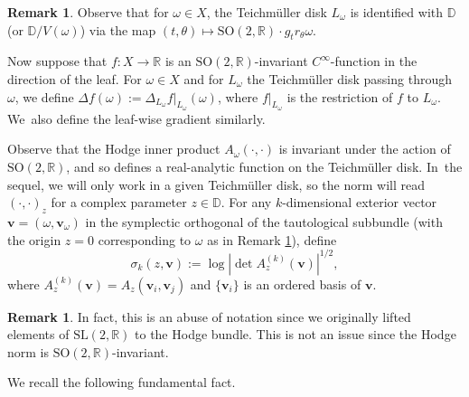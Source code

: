 \documentclass[JEP,XML,SOM,Unicode,published]{cedram}
\theoremstyle{plain}
\theoremstyle{definition}
\newtheorem{rem}[thm]{Remark}
\numberwithin{equation}{subsection}
\newcommand\bD{\mathbb{D}}
\newcommand\bR{\mathbb{R}}\let\R\bR
\newcommand{\SL}{\mathrm{SL}}
\newcommand{\SO}{\mathrm{SO}}
\let\laplacian\Delta
\newcommand{\bfv}{\boldsymbol{v}}
\newcommand{\defeq}{:=}
\newcommand{\Tm}{Teichmüller\xspace}
\begin{document}
\begin{rem}\label{embedding}
Observe that for $\omega \in X$, the \Tm disk $L_\omega$ is identified with $\bD$ (or $\bD/V(\omega)$) via the map $(t,\theta) \mapsto \SO(2,\bR) \cdot g_{t} r_{\theta} \omega$.
\end{rem}

Now suppose that $f: X\to\R$ is an $\SO(2,\bR)$-invariant $C^\infty$-function in the direction of the leaf. For $\omega \in X$ and for $L_\omega$ the \Tm disk passing through $\omega$, we define $\laplacian f(\omega) \defeq \laplacian_{L_\omega} f|_{L_\omega}(\omega)$, where $f|_{L_\omega}$ is the restriction of $f$ to $L_\omega$. We~also define the leaf-wise gradient similarly.

Observe that the Hodge inner product $A_{\omega}(\cdot,\cdot)$ is invariant under the action of $\SO(2,\bR)$, and so defines a real-analytic function on the \Tm disk. In~the sequel, we will only work in a given \Tm disk, so the norm will read $(\cdot,\cdot)_z$ for a complex parameter $z \in \bD$. For any $k$-dimensional exterior vector $\bfv=(\omega,\bfv_{\omega})$ in the symplectic orthogonal of the tautological subbundle (with the origin $z=0$ corresponding to $\omega$ as in Remark \ref{embedding}), define\vspace*{-3pt}
\[
\sigma_k(z,\bfv) := \log |{\det A^{(k)}_{z} (\bfv)}|^{1/2},
\]
where $A^{(k)}_{z}(\bfv) = A_z(\bfv_i,\bfv_j)$ and $\{\bfv_i\}$ is an ordered basis of $\bfv$.
\begin{rem}In fact, this is an abuse of notation since we originally lifted elements of $\SL(2,\bR)$ to the Hodge bundle. This is not an issue since the Hodge norm is $\SO(2,\bR)$-invariant.
\end{rem}

We recall the following fundamental fact.
\end{document}
